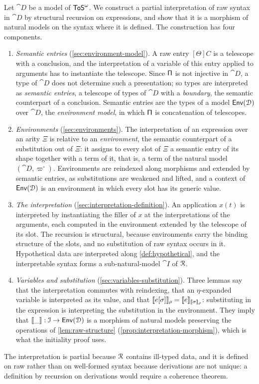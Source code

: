 Let $\cat{D}$ be a model of $\mathsf{ToS}^\omega$. We construct a partial interpretation of raw syntax in $\cat{D}$ by structural recursion on expressions, and show that it is a morphism of natural models on the syntax where it is defined. The construction has four components.
\begin{enumerate}
    \item \emph{Semantic entries} (\cref{sec:environment-model}). A raw entry $[\Theta]C$ is a telescope with a conclusion, and the interpretation of a variable of this entry applied to arguments has to instantiate the telescope. Since $\mathsf{\Pi}$ is not injective in $\cat{D}$, a type of $\cat{D}$ does not determine such a presentation; so types are interpreted as \emph{semantic entries}, a telescope of types of $\cat{D}$ with a \emph{boundary}, the semantic counterpart of a conclusion. Semantic entries are the types of a model $\mathsf{Env}(\mathcal{D})$ over $\cat{D}$, the \emph{environment model}, in which $\mathsf{\Pi}$ is concatenation of telescopes.
    \item \emph{Environments} (\cref{sec:environments}). The interpretation of an expression over an arity $\Xi$ is relative to an \emph{environment}, the semantic counterpart of a substitution out of $\Xi$: it assigns to every slot of $\Xi$ a semantic entry of its shape together with a term of it, that is, a term of the natural model $(\cat{D}, \varpi^{\circ})$. Environments are reindexed along morphisms and extended by semantic entries, as substitutions are weakened and lifted, and a context of $\mathsf{Env}(\mathcal{D})$ is an environment in which every slot has its generic value.
    \item \emph{The interpretation} (\cref{sec:interpretation-definition}). An application $x(t)$ is interpreted by instantiating the filler of $x$ at the interpretations of the arguments, each computed in the environment extended by the telescope of its slot. The recursion is structural, because environments carry the binding structure of the slots, and no substitution of raw syntax occurs in it. Hypothetical data are interpreted along \cref{def:hypothetical}, and the interpretable syntax forms a sub-natural-model $\cat{I}$ of $\mathcal{R}$.
    \item \emph{Variables and substitution} (\cref{sec:variables-substitution}). Three lemmas say that the interpretation commutes with reindexing, that an $\eta$-expanded variable is interpreted as its value, and that $\llbracket e[\sigma]\rrbracket_\rho = \llbracket e\rrbracket_{\llbracket\sigma\rrbracket_\rho}$: substituting in the expression is interpreting the substitution in the environment. They imply that $\llbracket\_\rrbracket : \mathcal{I} \to \mathsf{Env}(\mathcal{D})$ is a morphism of natural models preserving the operations of \cref{lem:raw-structure} (\cref{prop:interpretation-morphism}), which is what the initiality proof uses.
\end{enumerate}
The interpretation is partial because $\mathcal{R}$ contains ill-typed data, and it is defined on raw rather than on well-formed syntax because derivations are not unique: a definition by recursion on derivations would require a coherence theorem.

